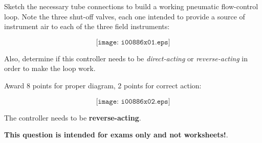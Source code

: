 

Sketch the necessary tube connections to build a working pneumatic flow-control loop.  Note the three shut-off valves, each one intended to provide a source of instrument air to each of the three field instruments:

$$\texttt{[image: i00886x01.eps]}$$

Also, determine if this controller needs to be {\it direct-acting} or {\it reverse-acting} in order to make the loop work.







Award 8 points for proper diagram, 2 points for correct action:

$$\texttt{[image: i00886x02.eps]}$$

The controller needs to be {\bf reverse-acting}.







{\bf This question is intended for exams only and not worksheets!}.



